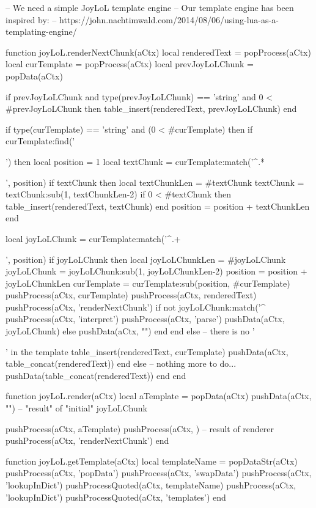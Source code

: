 -- We need a simple JoyLoL template engine
-- Our template engine has been inspired by:
--   https://john.nachtimwald.com/2014/08/06/using-lua-as-a-templating-engine/

function joyLoL.renderNextChunk(aCtx)
  local renderedText    = popProcess(aCtx)
  local curTemplate     = popProcess(aCtx)
  local prevJoyLoLChunk = popData(aCtx)
  
  if prevJoyLoLChunk
    and type(prevJoyLoLChunk) == 'string'
    and 0 < #prevJoyLoLChunk then
    table_insert(renderedText, prevJoyLoLChunk)
  end
  
  if type(curTemplate) == 'string' and (0 < #curTemplate) then
    if curTemplate:find('{{') then
      local position  = 1
      local textChunk = curTemplate:match('^.*{{', position)
      if textChunk then 
        local textChunkLen = #textChunk
        textChunk = textChunk:sub(1, textChunkLen-2)
        if 0 < #textChunk then table_insert(renderedText, textChunk) end
        position = position + textChunkLen
      end
      
      local joyLoLChunk = curTemplate:match('^.+}}', position)
      if joyLoLChunk then
        local joyLoLChunkLen = #joyLoLChunk
        joyLoLChunk = joyLoLChunk:sub(1, joyLoLChunkLen-2)
        position = position + joyLoLChunkLen
        curTemplate = curTemplate:sub(position, #curTemplate)
        pushProcess(aCtx, curTemplate)
        pushProcess(aCtx, renderedText)
        pushProcess(aCtx, 'renderNextChunk')
        if not joyLoLChunk:match('^%
          pushProcess(aCtx, 'interpret')
          pushProcess(aCtx, 'parse')
          pushData(aCtx, joyLoLChunk)
        else
          pushData(aCtx, "")
        end
      end
    else -- there is no '{{' in the template
      table_insert(renderedText, curTemplate)
      pushData(aCtx, table_concat(renderedText))
    end
  else
    -- nothing more to do...
    pushData(table_concat(renderedText))
  end
end

function joyLoL.render(aCtx)
  local aTemplate = popData(aCtx)
  pushData(aCtx, "")    -- "result" of "initial" joyLoLChunk

  pushProcess(aCtx, aTemplate)
  pushProcess(aCtx, {}) -- result of renderer
  pushProcess(aCtx, 'renderNextChunk')
end

function joyLoL.getTemplate(aCtx)
  local templateName = popDataStr(aCtx)
  pushProcess(aCtx, 'popData')
  pushProcess(aCtx, 'swapData')
  pushProcess(aCtx, 'lookupInDict')
  pushProcessQuoted(aCtx, templateName)
  pushProcess(aCtx, 'lookupInDict')
  pushProcessQuoted(aCtx, 'templates')
end

}}}}
